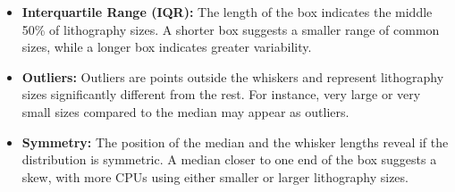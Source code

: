 \documentclass{article}
\begin{document}
\begin{itemize}
\begin{itemize}
\begin{itemize}
				\item \textbf{Interquartile Range (IQR):} The length of the box indicates the middle 50\% of lithography sizes. A shorter box suggests a smaller range of common sizes, while a longer box indicates greater variability.
				\item \textbf{Outliers:} Outliers are points outside the whiskers and represent lithography sizes significantly different from the rest. For instance, very large or very small sizes compared to the median may appear as outliers.
				\item \textbf{Symmetry:} The position of the median and the whisker lengths reveal if the distribution is symmetric. A median closer to one end of the box suggests a skew, with more CPUs using either smaller or larger lithography sizes.
			\end{itemize}
		\end{itemize}
	\end{itemize}
\end{document}
